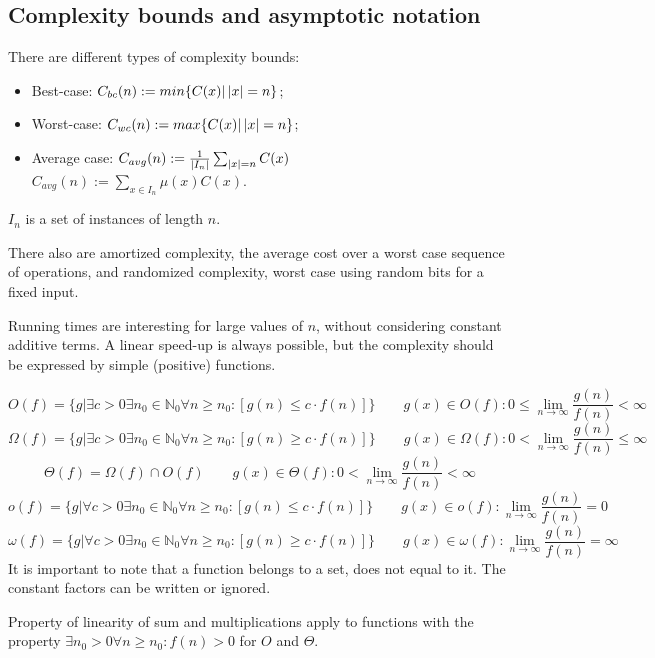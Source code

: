 \subsection{Complexity bounds and asymptotic notation}
There are different types of complexity bounds:
\begin{itemize}
	\item Best-case: $C_{bc}(n) := min\{C(x) | \left|x\right| = n\}$;
	\item Worst-case: $C_{wc}(n) := max\{C(x) | \left|x\right| = n\}$;
	\item Average case: $C_{avg}(n) := \frac{1}{\left|I_n\right|} \sum_{\left|x\right| = n} C(x)$ \\
	$C_{avg}(n) := \sum_{x \in I_n} \mu(x) C(x)$.
\end{itemize}
$I_n$ is a set of instances of length $n$.

There also are amortized complexity, the average cost over a worst case sequence of operations, and randomized complexity, worst case using random bits for a fixed input.

Running times are interesting for large values of $n$, without considering constant additive terms. A linear speed-up is always possible, but the complexity should be expressed by simple (positive) functions.

$$O(f) = \{g | \exists c > 0 \exists n_0 \in \mathbb{N}_0 \forall n \geq n_0 : [g(n) \leq c \cdot f(n)]\} \qquad g(x) \in O(f): 0 \leq \lim\limits_{n \rightarrow \infty} \frac{g(n)}{f(n)} < \infty$$
$$\Omega(f) = \{g | \exists c > 0 \exists n_0 \in \mathbb{N}_0 \forall n \geq n_0 : [g(n) \geq c \cdot f(n)]\} \qquad g(x) \in \Omega(f): 0 < \lim\limits_{n \rightarrow \infty} \frac{g(n)}{f(n)} \leq \infty$$
$$\Theta(f) = \Omega(f) \cap O(f) \qquad g(x) \in \Theta(f): 0 < \lim\limits_{n \rightarrow \infty} \frac{g(n)}{f(n)} < \infty$$
$$o(f) = \{g | \forall c > 0 \exists n_0 \in \mathbb{N}_0 \forall n \geq n_0 : [g(n) \leq c \cdot f(n)]\} \qquad g(x) \in o(f): \lim\limits_{n \rightarrow \infty} \frac{g(n)}{f(n)} = 0$$
$$\omega(f) = \{g | \forall c > 0 \exists n_0 \in \mathbb{N}_0 \forall n \geq n_0 : [g(n) \geq c \cdot f(n)]\} \qquad g(x) \in \omega(f): \lim\limits_{n \rightarrow \infty} \frac{g(n)}{f(n)} = \infty$$
It is important to note that a function belongs to a set, does not equal to it. The constant factors can be written or ignored.

Property of linearity of sum and multiplications apply to functions with the property $\exists n_0 > 0 \forall n \geq n_0 : f(n) > 0$ for $O$ and $\Theta$.

